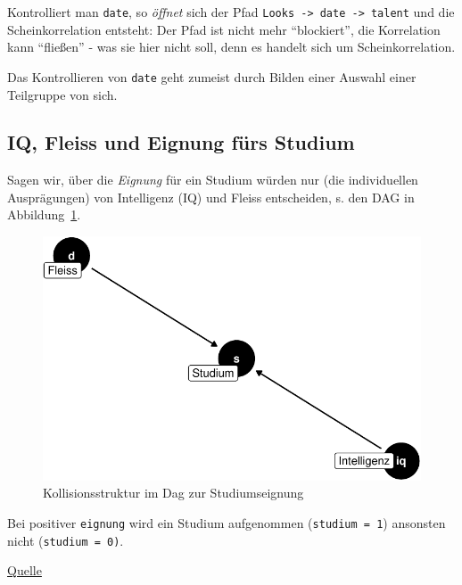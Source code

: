\documentclass[
  a4paper,
  DIV=11]{scrreprt}
\theoremstyle{definition}
\theoremstyle{remark}
\begin{document}
Kontrolliert man \texttt{date}, so \emph{öffnet} sich der Pfad
\texttt{Looks\ -\textgreater{}\ date\ -\textgreater{}\ talent} und die
Scheinkorrelation entsteht: Der Pfad ist nicht mehr ``blockiert'', die
Korrelation kann ``fließen'' - was sie hier nicht soll, denn es handelt
sich um Scheinkorrelation.

Das Kontrollieren von \texttt{date} geht zumeist durch Bilden einer
Auswahl einer Teilgruppe von sich.

\hypertarget{iq-fleiss-und-eignung-fuxfcrs-studium}{%
\subsection{IQ, Fleiss und Eignung fürs
Studium}\label{iq-fleiss-und-eignung-fuxfcrs-studium}}

Sagen wir, über die \emph{Eignung} für ein Studium würden nur (die
individuellen Ausprägungen) von Intelligenz (IQ) und Fleiss entscheiden,
s. den DAG in Abbildung~\ref{fig-coll3-dag}.

\begin{figure}

{\centering \includegraphics{./kausal_files/figure-pdf/fig-coll3-dag-1.pdf}

}

\caption{\label{fig-coll3-dag}Kollisionsstruktur im Dag zur
Studiumseignung}

\end{figure}

Bei positiver \texttt{eignung} wird ein Studium aufgenommen
(\texttt{studium\ =\ 1}) ansonsten nicht (\texttt{studium\ =\ 0)}.

\href{https://data-se.netlify.app/2020/04/16/simulation-berkson-s-paradox/}{Quelle}
\end{document}
